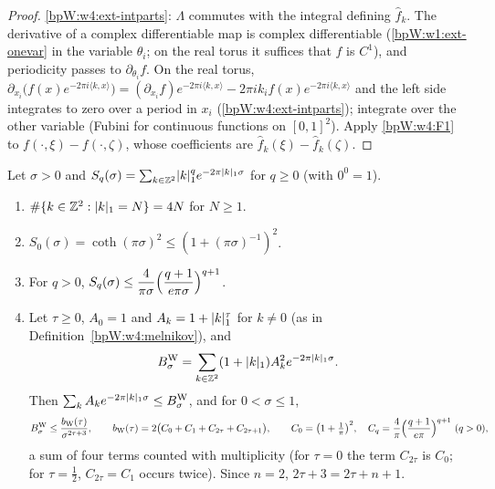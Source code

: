 \begin{proof}
\label{stepW:w4:linimg}
\ref{bpW:w4:ext-intparts}: $\Lambda$ commutes with the integral defining $\hat f_k$.
\label{stepW:w4:deriv}
The derivative of a complex differentiable map is complex differentiable (\ref{bpW:w1:ext-onevar} in the variable
$\theta_i$; on the real torus it suffices that $f$ is $C^1$), and periodicity passes to $\partial_{\theta_i}f$. On the
real torus, $\partial_{x_i}\bigl(f(x)e^{-2\pi i\langle k,x\rangle}\bigr)=(\partial_{x_i}f)e^{-2\pi i\langle k,x\rangle}-2\pi ik_if(x)e^{-2\pi i\langle k,x\rangle}$
and the left side integrates to zero over a period in $x_i$ (\ref{bpW:w4:ext-intparts}); integrate over the other
variable (Fubini for continuous functions on $[0,1]^2$).
\label{stepW:w4:fpar}
Apply \ref{bpW:w4:F1} to $f(\cdot,\xi)-f(\cdot,\zeta)$, whose coefficients are $\hat f_k(\xi)-\hat f_k(\zeta)$.
\end{proof}

\begin{lemma}\label{bpW:w4:lattice}
Let $\sigma>0$ and $S_q(\sigma)=\sum_{k\in\mathbb{Z}^2}\lvert k\rvert_1^qe^{-2\pi\lvert k\rvert_1\sigma}$ for $q\ge0$ (with $0^0=1$).
\begin{enumerate}[label=(\roman*)]
\item $\#\{k\in\mathbb{Z}^2:\lvert k\rvert_1=N\}=4N$ for $N\ge1$.
\item $S_0(\sigma)=\coth(\pi\sigma)^2\le(1+(\pi\sigma)^{-1})^2$.
\item For $q>0$, $S_q(\sigma)\le\dfrac4{\pi\sigma}\Bigl(\dfrac{q+1}{e\pi\sigma}\Bigr)^{q+1}$.
\item Let $\tau\ge0$, $A_0=1$ and $A_k=1+\lvert k\rvert_1^\tau$ for $k\ne0$ (as in Definition~\ref{bpW:w4:melnikov}), and
  \[B^{\rm W}_\sigma=\sum_{k\in\mathbb{Z}^2}(1+\lvert k\rvert_1)A_k^2e^{-2\pi\lvert k\rvert_1\sigma}.\]
  Then $\sum_kA_ke^{-2\pi\lvert k\rvert_1\sigma}\le B^{\rm W}_\sigma$, and for $0<\sigma\le1$,
  \[B^{\rm W}_\sigma\le\frac{b_{\rm W}(\tau)}{\sigma^{2\tau+3}},\qquad
  b_{\rm W}(\tau)=2\bigl(C_0+C_1+C_{2\tau}+C_{2\tau+1}\bigr),\qquad C_0=\bigl(1+\tfrac1\pi\bigr)^2,\quad
  C_q=\frac4\pi\Bigl(\frac{q+1}{e\pi}\Bigr)^{q+1}\ (q>0),\]
  a sum of four terms counted with multiplicity (for $\tau=0$ the term $C_{2\tau}$ is $C_0$; for $\tau=\frac12$,
  $C_{2\tau}=C_1$ occurs twice). Since $n=2$, $2\tau+3=2\tau+n+1$.
\end{enumerate}
\end{lemma}

